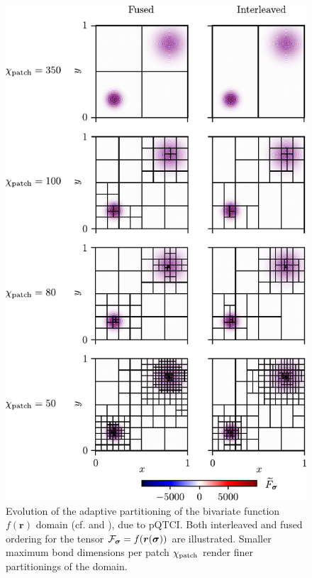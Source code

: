 \begin{figure}[htbp]
	\includegraphics{figures/PatchEvolutionwithChi.pdf}
	\caption{Evolution of the adaptive partitioning of the bivariate function $f(\boldsymbol{r})$ domain (cf.  and ), due to pQTCI. Both interleaved and fused ordering for the tensor $\mathcal{F}_{\boldsymbol{\sigma}} = f(\boldsymbol{r}(\boldsymbol{\sigma}))$ are illustrated. Smaller maximum bond dimensions per patch $\chi_{\text{patch}}$ render finer partitionings of the domain.}
	\label{fig:patchEvolution}
\end{figure}



